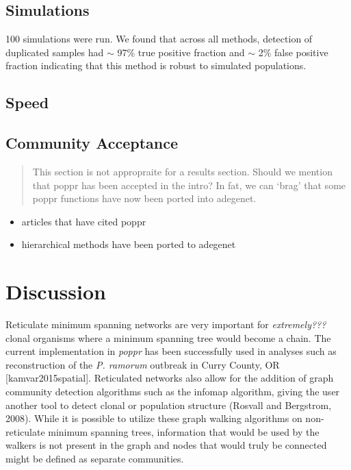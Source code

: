 \documentclass{frontiersSCNS} %
\begin{document}
\subsection*{Simulations}\label{simulations}

100 simulations were run. We found that across all methods, detection of
duplicated samples had \(\sim\) 97\% true positive fraction and \(\sim\)
2\% false positive fraction indicating that this method is robust to
simulated populations.

\subsection*{Speed}\label{speed}

\subsection*{Community Acceptance}\label{community-acceptance}

\begin{quote}
This section is not appropraite for a results section. Should we mention
that poppr has been accepted in the intro? In fat, we can `brag' that
some poppr functions have now been ported into adegenet.
\end{quote}

\begin{itemize}
\itemsep1pt\parskip0pt
\item
  articles that have cited poppr
\item
  hierarchical methods have been ported to adegenet
\end{itemize}

\section*{Discussion}\label{discussion}

Reticulate minimum spanning networks are very important for
\emph{extremely???} clonal organisms where a minimum spanning tree would
become a chain. The current implementation in \emph{poppr} has been
successfully used in analyses such as reconstruction of the \emph{P.
ramorum} outbreak in Curry County, OR {[}kamvar2015spatial{]}.
Reticulated networks also allow for the addition of graph community
detection algorithms such as the infomap algorithm, giving the user
another tool to detect clonal or population structure (Rosvall and
Bergstrom, 2008). While it is possible to utilize these graph walking
algorithms on non-reticulate minimum spanning trees, information that
would be used by the walkers is not present in the graph and nodes that
would truly be connected might be defined as separate communities.
\end{document}
